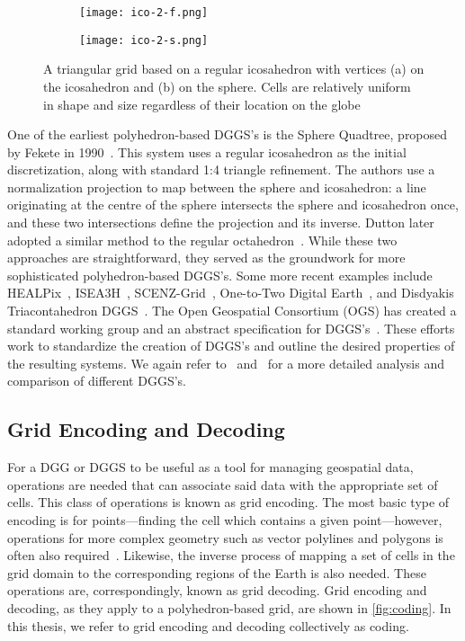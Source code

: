 \begin{figure*}[ht!]
	\centering
	\begin{subfigure}[]{0.5\textwidth}
		\centering
		\texttt{[image: ico-2-f.png]}
		\caption{}
	\end{subfigure}%
	\begin{subfigure}[]{0.5\textwidth}
		\centering
		\texttt{[image: ico-2-s.png]}
		\caption{}
	\end{subfigure}

	\caption[An icosahedron-based grid]{
		A triangular grid based on a regular icosahedron with vertices (a) on the icosahedron and (b) on the sphere.
		Cells are relatively uniform in shape and size regardless of their location on the globe
	}
	\label{fig:poly-grid}
\end{figure*}


One of the earliest polyhedron-based DGGS's is the Sphere Quadtree, proposed by Fekete in 1990~\cite{fekete1990sphere}.
This system uses a regular icosahedron as the initial discretization, along with standard 1:4 triangle refinement.
The authors use a normalization projection to map between the sphere and icosahedron: a line originating at the centre of the sphere intersects the sphere and icosahedron once, and these two intersections define the projection and its inverse.
Dutton later adopted a similar method to the regular octahedron~\cite{dutton1996encoding}.
While these two approaches are straightforward, they served as the groundwork for more sophisticated polyhedron-based DGGS's.
Some more recent examples include HEALPix~\cite{gorski2005healpix}, ISEA3H~\cite{sahr2003geodesic}, SCENZ-Grid~\cite{scenz}, One-to-Two Digital Earth~\cite{mahdavi2013one}, and Disdyakis Triacontahedron DGGS~\cite{hall2020disdyakis}.
The Open Geospatial Consortium (OGS) has created a standard working group and an abstract specification for DGGS's~\cite{ogcDGGS, purss2016ogc}.
These efforts work to standardize the creation of DGGS's and outline the desired properties of the resulting systems.
We again refer to~\cite{mahdavi2015survey} and~\cite{alderson2020digital} for a more detailed analysis and comparison of different DGGS's.


\subsection{Grid Encoding and Decoding} \label{chap:2:coding}
For a DGG or DGGS to be useful as a tool for managing geospatial data, operations are needed that can associate said data with the appropriate set of cells.
This class of operations is known as grid encoding.
The most basic type of encoding is for points---finding the cell which contains a given point---however, operations for more complex geometry such as vector polylines and polygons is often also required~\cite{du2018duality}.
Likewise, the inverse process of mapping a set of cells in the grid domain to the corresponding regions of the Earth is also needed.
These operations are, correspondingly, known as grid decoding.
Grid encoding and decoding, as they apply to a polyhedron-based grid, are shown in \cref{fig:coding}.
In this thesis, we refer to grid encoding and decoding collectively as coding.


